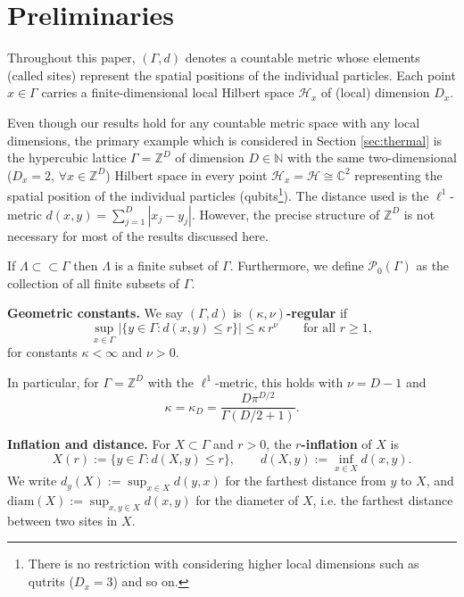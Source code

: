 \documentclass[11pt]{article}
\numberwithin{equation}{section}
\numberwithin{figure}{section}
\numberwithin{table}{section}
\theoremstyle{definition}
\theoremstyle{plain}
\theoremstyle{remark}
\newcommand{\Hil}{\mathcal{H}}
\newcommand{\La}{\Lambda}
\newcommand{\G}{\Gamma}
\newcommand{\abs}[1]{\left \vert#1\right\vert}
\begin{document}
\section{Preliminaries}
Throughout this paper, $(\G,d)$ denotes a countable metric whose elements (called sites) represent the spatial positions of the individual particles. Each point $x\in\G$ carries a finite-dimensional local Hilbert space $\Hil_x$ of (local) dimension $D_x$.

Even though our results hold for any countable metric space with any local dimensions, the primary example which is considered in Section \ref{sec:thermal} is the hypercubic lattice $\G=\mathbb{Z}^D$ of dimension $D\in \mathbb{N}$ with the same two-dimensional ($D_x=2$, $\forall x\in\mathbb{Z}^D$) Hilbert space in every point $\Hil_x=\Hil\cong \mathbb{C}^2$ representing the spatial position of the individual particles (qubits\footnote{There is no restriction with considering higher local dimensions such as qutrits ($D_x=3$) and so on.}). The distance used is the $\ell^1$-metric $d(x,y)=\sum_{j=1}^D\abs{x_j-y_j}$. However, the precise structure of $\mathbb{Z}^D$ is not necessary for most of the results discussed here.

If $\La\subset\subset \G$ then $\La$ is a finite subset of $\G$. Furthermore, we define $\mathcal{P}_0(\G)$ as the collection of all finite subsets of $\G$.


\noindent\textbf{Geometric constants.} We say $(\Gamma, d)$ is 
$(\kappa, \nu)$\textbf{-regular} if
\begin{equation}
    \sup_{x \in \Gamma} \left|\{y \in \Gamma : d(x,y) \leq r\}\right| 
    \leq \kappa\, r^\nu 
    \qquad \text{for all } r \geq 1,
    \label{eq:regularity}
\end{equation}
for constants $\kappa < \infty$ and $\nu > 0$. 

In particular, for $\Gamma = \mathbb{Z}^D$ 
with the $\ell^1$-metric, this holds with $\nu=D-1$ and \begin{equation}\kappa = \kappa_D = \frac{D\pi^{D/2}}{\Gamma(D/2+1)}.\label{eq:geometricK}\end{equation}
\medskip


\noindent\textbf{Inflation and distance.} For $X \subset \Gamma$ and 
$r > 0$, the $r$\textbf{-inflation} of $X$ is
\begin{equation}
    X(r) := \{y \in \Gamma : d(X, y) \leq r\}, 
    \qquad d(X,y) := \inf_{x \in X} d(x,y).
\end{equation}
We write $d_y(X) := \sup_{x \in X} d(y,x)$ for the farthest distance 
from $y$ to $X$, and $\mathrm{diam}(X) := \sup_{x,y \in X} d(x,y)$ 
for the diameter of $X$, i.e. the farthest distance between two sites in $X$. 
\end{document}
